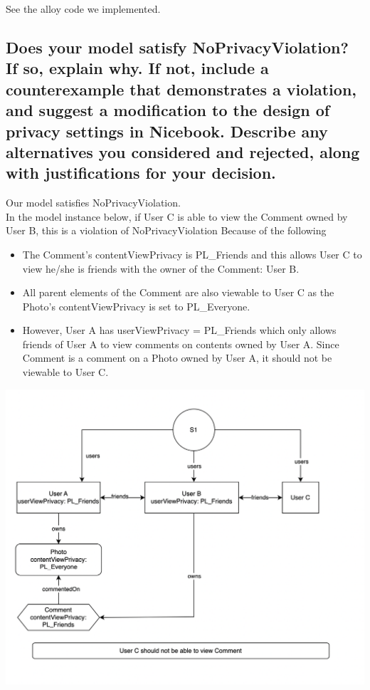 \documentclass[titlepage]{article}
\begin{document}
See the alloy code we implemented.

\subsection{Does your model satisfy NoPrivacyViolation? If so, explain why. If not, include a counterexample that
	demonstrates a violation, and suggest a modification to the design of privacy settings in Nicebook. Describe
	any alternatives you considered and rejected, along with justifications for your decision.}

Our model satisfies NoPrivacyViolation. \\
In the model instance below, if User C is able to view the Comment owned by User B, this is a violation of NoPrivacyViolation Because of the following
\begin{itemize}
	\item The Comment's contentViewPrivacy is PL\_Friends and this allows User C to view he/she is friends with the owner of the Comment: User B.
	\item All parent elements of the Comment are also viewable to User C as the Photo's contentViewPrivacy is set to PL\_Everyone.
	\item However, User A has userViewPrivacy = PL\_Friends which only allows friends of User A to view comments on contents owned by User A. Since Comment is a comment on a Photo owned by User A, it should not be viewable to User C.
\end{itemize} 

\includegraphics[width=6in]{images/privacy_violation.png}
\end{document}
